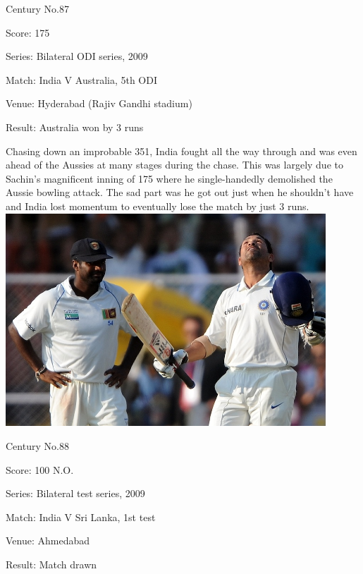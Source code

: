\documentclass[11pt, a4paper]{article}
\begin{document}
Century No.87 

Score: 175 

Series: Bilateral ODI series, 2009 

Match: India V Australia, 5th ODI 

Venue: Hyderabad (Rajiv Gandhi stadium) 

Result: Australia won by 3 runs 

Chasing down an improbable 351, India fought all the way through and was even ahead of the Aussies at many stages during the chase. This was largely due to Sachin's magnificent inning of 175 where he single-handedly demolished the Aussie bowling attack. The sad part was he got out just when he shouldn't have and India lost momentum to eventually lose the match by just 3 runs.
\newpage
\includegraphics[width=0.9\textwidth]{pics/88.jpg}

Century No.88 

Score: 100 N.O. 

Series: Bilateral test series, 2009 

Match: India V Sri Lanka, 1st test 

Venue: Ahmedabad 

Result: Match drawn 
\end{document}
